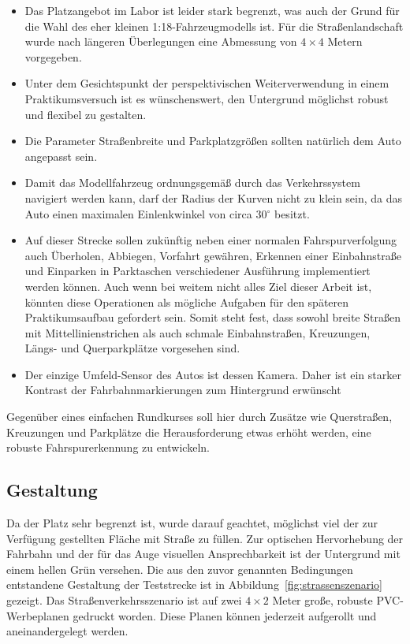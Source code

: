 \begin{itemize}
	\item Das Platzangebot im Labor ist leider stark begrenzt, was auch der Grund für die Wahl des eher kleinen 1:18-Fahrzeugmodells ist. Für die Straßenlandschaft wurde nach längeren Überlegungen eine Abmessung von \(4 \times 4\) Metern vorgegeben.
	
	\item Unter dem Gesichtspunkt der perspektivischen Weiterverwendung in einem Praktikumsversuch ist es wünschenswert, den Untergrund möglichst robust und flexibel zu gestalten.
	
	\item Die Parameter Straßenbreite und Parkplatzgrößen sollten natürlich dem Auto angepasst sein. 
	
	\item Damit das Modellfahrzeug ordnungsgemäß durch das Verkehrssystem navigiert werden kann, darf der Radius der Kurven nicht zu klein sein, da das Auto einen maximalen Einlenkwinkel von circa 30\(^\circ\) besitzt. 
	
	\item Auf dieser Strecke sollen zukünftig neben einer normalen Fahrspurverfolgung auch Überholen, Abbiegen, Vorfahrt gewähren, Erkennen einer Einbahnstraße und Einparken in Parktaschen verschiedener Ausführung implementiert werden können. Auch wenn bei weitem nicht alles Ziel dieser Arbeit ist, könnten diese Operationen als mögliche Aufgaben für den späteren Praktikumsaufbau gefordert sein. Somit steht fest, dass sowohl breite Straßen mit Mittellinienstrichen als auch schmale Einbahnstraßen, Kreuzungen, Längs- und Querparkplätze vorgesehen sind.
	
	\item Der einzige Umfeld-Sensor des Autos ist dessen Kamera. Daher ist ein starker Kontrast der Fahrbahnmarkierungen zum Hintergrund erwünscht
\end{itemize}

Gegenüber eines einfachen Rundkurses soll hier durch Zusätze wie Querstraßen, Kreuzungen und Parkplätze die Herausforderung etwas erhöht werden, eine robuste Fahrspurerkennung zu entwickeln. 

\subsection{Gestaltung}

Da der Platz sehr begrenzt ist, wurde darauf geachtet, möglichst viel der zur Verfügung gestellten Fläche mit Straße zu füllen. Zur optischen Hervorhebung der Fahrbahn und der für das Auge visuellen Ansprechbarkeit ist der Untergrund mit einem hellen Grün versehen. Die aus den zuvor genannten Bedingungen entstandene Gestaltung der Teststrecke ist in Abbildung~\ref{fig:strassenszenario} gezeigt. Das Straßenverkehrsszenario ist auf zwei \(4 \times 2\) Meter große, robuste PVC-Werbeplanen gedruckt worden. Diese Planen können jederzeit aufgerollt und aneinandergelegt werden.


